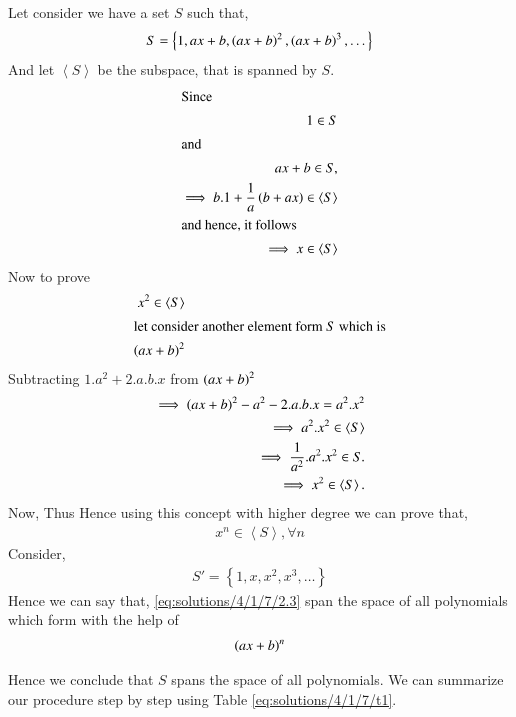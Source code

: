 
 Let consider we have a set $S$ such that,
 \begin{align}
 S = \left \{    1, ax+b, \left(ax+b\right)^2, \left(ax+b\right)^3,  \dots  \right \}
 \end{align}
 And let $\left \langle S \right \rangle$ be the subspace, that is spanned by $S$.
 \begin{align}
 \intertext{Since}
  1 \in S\\
 \intertext{and}
  ax+b \in S,\\
  \implies  b.1 + \frac{1}{a}\left(b +ax\right) \in \left \langle S \right \rangle \\
  \intertext{and hence, it follows}
   \implies x \in \left \langle S \right \rangle 
 \end{align}
% 
 Now to prove
 \begin{align}
  x^2 \in \left \langle S \right \rangle \\
 \intertext{let consider another element form $S$ which is}
    \left(ax+b\right)^2
\end{align}
Subtracting $1.a^2 +2.a.b.x$ from $\left(ax+b\right)^2$
 \begin{align}
 \implies \left(ax+b\right)^2 - a^2 - 2.a.b.x = a^2.x^2 \label{eq:solutions/4/1/7/2.2}\\
 \implies a^2.x^2 \in \left \langle S \right \rangle\\
 \implies   \frac{1}{a^2} . a^2. x^2 \in S.\\
 \implies x^2 \in  \left \langle S \right \rangle .
 \end{align}
 Now, Thus  Hence using this concept with higher degree we can prove that,
 \begin{align}
   x^n \in  \left \langle S \right \rangle, \forall  n
  \end{align}
Consider,
 \begin{align}
 S' =   \left \{    1, x, x^2, x^3,  \dots  \right \} \label{eq:solutions/4/1/7/2.3}
   \end{align}
 Hence we can say that, \eqref{eq:solutions/4/1/7/2.3} span the space of all polynomials which form with the help of
 \begin{align} 
  \left(ax + b\right)^n
  \end{align}
   
Hence we conclude   that $S$ spans the space of all polynomials.
We can summarize our procedure step by step using Table \ref{eq:solutions/4/1/7/t1}.


